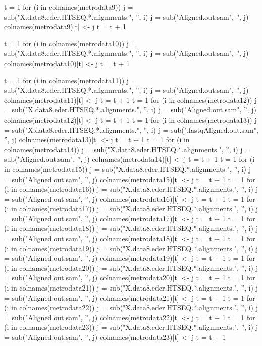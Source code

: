 \documentclass[10pt]{article}
\begin{document}
t = 1
for (i in colnames(metrodata9)){
  j = sub("X.data8.eder.HTSEQ.*.alignments.", '', i)
  j = sub("Aligned.out.sam", '', j)
  colnames(metrodata9)[t] <- j
  t = t + 1
}

t = 1
for (i in colnames(metrodata10)){
  j = sub("X.data8.eder.HTSEQ.*.alignments.", '', i)
  j = sub("Aligned.out.sam", '', j)
  colnames(metrodata10)[t] <- j
  t = t + 1
}

t = 1
for (i in colnames(metrodata11)){
  j = sub("X.data8.eder.HTSEQ.*.alignments.", '', i)
  j = sub("Aligned.out.sam", '', j)
  colnames(metrodata11)[t] <- j
  t = t + 1
}
t = 1
for (i in colnames(metrodata12)){
  j = sub("X.data8.eder.HTSEQ.*.alignments.", '', i)
  j = sub("Aligned.out.sam", '', j)
  colnames(metrodata12)[t] <- j
  t = t + 1
}
t = 1
for (i in colnames(metrodata13)){
  j = sub("X.data8.eder.HTSEQ.*.alignments.", '', i)
  j = sub(".fastqAligned.out.sam", '', j)
  colnames(metrodata13)[t] <- j
  t = t + 1
}
t = 1
for (i in colnames(metrodata14)){
  j = sub("X.data8.eder.HTSEQ.*.alignments.", '', i)
  j = sub("Aligned.out.sam", '', j)
  colnames(metrodata14)[t] <- j
  t = t + 1
}
t = 1
for (i in colnames(metrodata15)){
  j = sub("X.data8.eder.HTSEQ.*.alignments.", '', i)
  j = sub("Aligned.out.sam", '', j)
  colnames(metrodata15)[t] <- j
  t = t + 1
}
t = 1
for (i in colnames(metrodata16)){
  j = sub("X.data8.eder.HTSEQ.*.alignments.", '', i)
  j = sub("Aligned.out.sam", '', j)
  colnames(metrodata16)[t] <- j
  t = t + 1
}
t = 1
for (i in colnames(metrodata17)){
  j = sub("X.data8.eder.HTSEQ.*.alignments.", '', i)
  j = sub("Aligned.out.sam", '', j)
  colnames(metrodata17)[t] <- j
  t = t + 1
}
t = 1
for (i in colnames(metrodata18)){
  j = sub("X.data8.eder.HTSEQ.*.alignments.", '', i)
  j = sub("Aligned.out.sam", '', j)
  colnames(metrodata18)[t] <- j
  t = t + 1
}
t = 1
for (i in colnames(metrodata19)){
  j = sub("X.data8.eder.HTSEQ.*.alignments.", '', i)
  j = sub("Aligned.out.sam", '', j)
  colnames(metrodata19)[t] <- j
  t = t + 1
}
t = 1
for (i in colnames(metrodata20)){
  j = sub("X.data8.eder.HTSEQ.*.alignments.", '', i)
  j = sub("Aligned.out.sam", '', j)
  colnames(metrodata20)[t] <- j
  t = t + 1
}
t = 1
for (i in colnames(metrodata21)){
  j = sub("X.data8.eder.HTSEQ.*.alignments.", '', i)
  j = sub("Aligned.out.sam", '', j)
  colnames(metrodata21)[t] <- j
  t = t + 1
}
t = 1
for (i in colnames(metrodata22)){
  j = sub("X.data8.eder.HTSEQ.*.alignments.", '', i)
  j = sub("Aligned.out.sam", '', j)
  colnames(metrodata22)[t] <- j
  t = t + 1
}
t = 1
for (i in colnames(metrodata23)){
  j = sub("X.data8.eder.HTSEQ.*.alignments.", '', i)
  j = sub("Aligned.out.sam", '', j)
  colnames(metrodata23)[t] <- j
  t = t + 1
}
\end{document}
